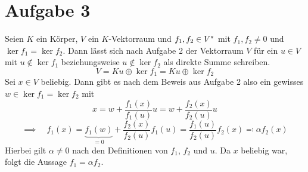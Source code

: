 
	\section*{Aufgabe 3}
	
		Seien $K$ ein Körper, $V$ ein $K$-Vektorraum und $f_1,f_2\in{V}^*$ mit $f_1,f_2\neq 0$ und $\ker f_1 = \ker f_2$.
		Dann lässt sich nach Aufgabe 2 der Vektorraum $V$ für ein $u\in V$ mit $u\notin \ker f_1$ beziehungsweise $u\notin \ker f_2$ als direkte Summe schreiben.
		\[
			V = Ku \oplus \ker f_1 = Ku \oplus \ker f_2
		\]
		Sei $x\in V$ beliebig.
		Dann gibt es nach dem Beweis aus Aufgabe 2 also ein gewisses $w\in\ker f_1 = \ker f_2$ mit
		\[
			x = w + \frac{f_1(x)}{f_1(u)}u = w + \frac{f_2(x)}{f_2(u)}u
		\]
		\[
			\implies \quad f_1(x) = \underbrace{f_1(w)}_{=0} + \frac{f_2(x)}{f_2(u)}f_1(u) = \frac{f_1(u)}{f_2(u)}f_2(x) \eqqcolon \alpha f_2(x)
		\]
		Hierbei gilt $\alpha\neq 0$ nach den Definitionen von $f_1$, $f_2$ und $u$.
		Da $x$ beliebig war, folgt die Aussage $f_1 = \alpha f_2$.
		\qedbox
	

	





